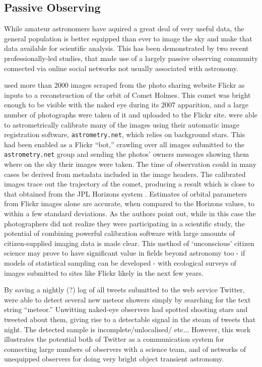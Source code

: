 \documentclass{ar2e}
\begin{document}
 

\subsection{Passive Observing}
\label{sec:obs:passive}

While amateur astronomers have aquired a great deal of very useful data, the
general population is better equipped than ever to image the sky and make that
data available for scientific analysis. This has been demonstrated by two
recent professionally-led studies, that made use of a largely passive
observing community connected via online social networks not usually
associated with astronomy. 

\citet{Lang++2011} used more than 2000 images scraped from the photo sharing website Flickr
as inputs to a reconstruction of the orbit of Comet Holmes. This comet was
bright enough to be visible with the naked eye during its 2007 apparition, and a large number
of photographs were taken of it and uploaded to the Flickr site.
\citeauthor{Lang++2011} were able to astrometrically calibrate many of the images using their automatic
image registration software, \texttt{astrometry.net}, which relies on background stars. This had been enabled as
a Flickr ``bot,'' crawling over all images submitted to the
\texttt{astrometry.net} group and sending the photos' owners messages showing
them where on the sky their images were taken.  The time of observation could in many cases be derived from metadata included in the image headers. The calibrated images trace out
the trajectory of the comet, producing a result which is close to that obtained from the JPL Horizons system \citep{Giorgini}. Estimates of orbital parameters from Flickr images alone are accurate, when compared to the Horizons values, to within a few standard deviations. As the authors point out, while in this case the
photographers did not realize they were participating in a scientific study,
the potential of combining powerful calibration software with large amounts of
citizen-supplied imaging data is made clear. This method of `unconscious' citizen science may prove to have significant value in fields beyond astronomy too - if models of statistical sampling can be developed - with ecological surveys of images submitted to sites like Flickr likely in the next few years. 

By saving a nightly (?) log of all tweets submitted to the web service
Twitter, \citet{Barentsen++2010} were able to 
detect several new meteor showers simply by searching for the text string
``meteor.'' Unwitting naked-eye observers had spotted shooting stars and
tweeted about them, giving rise to a detectable signal in the steam of tweets
that night. The detected sample is incomplete/unlocalised/ etc... However,
this work illustrates the potential both of Twitter as a communication system
for connecting large numbers of observers with a science team, and of networks
of unequipped observers for doing very bright object transient astronomy.
\end{document}
